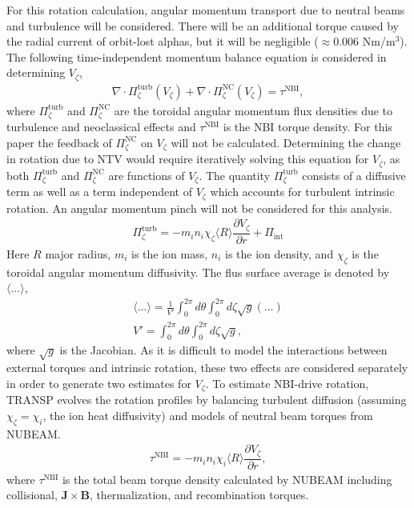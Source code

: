 \documentclass[aip, pop, preprint]{revtex4-1}
\numberwithin{figure}{section}
\numberwithin{equation}{section}
\newcommand{\partder}[2]{\dfrac{\partial  #1}{\partial  #2}} %
\begin{document}
For this rotation calculation, angular momentum transport due to neutral beams and turbulence will be considered. There will be an additional torque caused by the radial current of orbit-lost alphas,\cite{Rosenbluth1996} but it will be negligible ($\approx 0.006$ Nm/m$^3$). The following time-independent momentum balance equation is considered in determining $V_{\zeta}$,
\begin{gather}
\nabla \cdot \Pi_{\zeta}^{\text{turb}}(V_{\zeta}) + \nabla \cdot \Pi_{\zeta}^{\text{NC}}(V_{\zeta}) = \tau^{\text{NBI}},
\end{gather}
where $\Pi^{\text{turb}}_{\zeta}$ and $\Pi^{\text{NC}}_{\zeta}$ are the toroidal angular momentum flux densities due to turbulence and neoclassical effects and $\tau^{\text{NBI}}$ is the NBI torque density. For this paper the feedback of $\Pi_{\zeta}^{\text{NC}}$ on $V_{\zeta}$ will not be calculated. Determining the change in rotation due to NTV would require iteratively solving this equation for $V_{\zeta}$, as both $\Pi_{\zeta}^{\text{turb}}$ and $\Pi_{\zeta}^{\text{NC}}$ are functions of $V_{\zeta}$. The quantity $\Pi_{\zeta}^{\text{turb}}$ consists of a diffusive term as well as a term independent of $V_{\zeta}$ which accounts for turbulent intrinsic rotation. An angular momentum pinch will not be considered for this analysis. 
\begin{gather}
\Pi_{\zeta}^{\text{turb}} = -m_i n_i \chi_{\zeta} \langle R \rangle\partder{V_{\zeta}}{r} + \Pi_{\text{int}}
\end{gather}
Here $R$ major radius, $m_i$ is the ion mass, $n_i$ is the ion density, and $\chi_{\zeta}$ is the toroidal angular momentum diffusivity. The flus surface average is denoted by $\langle ... \rangle$,
\begin{gather}
\langle ... \rangle = \frac{1}{V'} \int_0^{2 \pi} d \theta \int_0^{2 \pi} d \zeta \sqrt{g} (...)
\\ V' = \int_0^{2\pi} d \theta \int_0^{2 \pi} d \zeta \sqrt{g},
\end{gather}
where $\sqrt{g}$ is the Jacobian. As it is difficult to model the interactions between external torques and intrinsic rotation, these two effects are considered separately in order to generate two estimates for $V_{\zeta}$. To estimate NBI-drive rotation, TRANSP evolves the rotation profiles by balancing turbulent diffusion (assuming $\chi_{\zeta} = \chi_{i}$, the ion heat diffusivity) and models of neutral beam torques from NUBEAM. 
\begin{gather}
\tau^{\text{NBI}} = -m_i n_i \chi_{i} \langle R \rangle \partder{V_{\zeta}}{r},
\end{gather}
where $\tau^{\text{NBI}}$ is the total beam torque density calculated by NUBEAM including collisional, $\bm{J} \times \bm{B}$, thermalization, and recombination torques.
\end{document}

